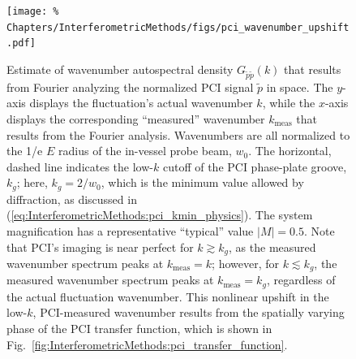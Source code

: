 \begin{figure}
  \centering
  \texttt{[image: \%
    Chapters/InterferometricMethods/figs/pci\_wavenumber\_upshift.pdf]}
    \caption[Nonlinear upshift in low-$k$, PCI-measured wavenumber]{%
    Estimate of wavenumber autospectral density $G_{\tilde{p}\tilde{p}}(k)$
    that results from Fourier analyzing
    the normalized PCI signal $\tilde{p}$ in space.
    The $y$-axis displays the fluctuation's actual wavenumber $k$, while
    the $x$-axis displays the corresponding ``measured'' wavenumber
    $k_{\text{meas}}$ that results from the Fourier analysis.
    Wavenumbers are all normalized
    to the 1/e $E$ radius of the in-vessel probe beam, $w_0$.
    The horizontal, dashed line indicates
    the low-$k$ cutoff of the PCI phase-plate groove, $k_g$;
    here, $k_g = 2 / w_0$,
    which is the minimum value allowed by diffraction,
    as discussed in
    (\ref{eq:InterferometricMethods:pci_kmin_physics}).
    The system magnification has
    a representative ``typical'' value $|M| = 0.5$.
    Note that PCI's imaging is near perfect for $k \gtrsim k_g$,
    as the measured wavenumber spectrum peaks at $k_{\text{meas}} = k$;
    however, for $k \lesssim k_g$,
    the measured wavenumber spectrum peaks at $k_{\text{meas}} = k_g$,
    regardless of the actual fluctuation wavenumber.
    This nonlinear upshift in the low-$k$, PCI-measured wavenumber
    results from the spatially varying phase
    of the PCI transfer function, which is shown in
    Fig.~\ref{fig:InterferometricMethods:pci_transfer_function}.
  }
\label{fig:InterferometricMethods:pci_wavenumber_upshift}
\end{figure}


